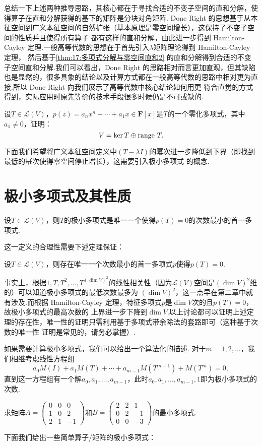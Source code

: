 总结一下上述两种推导思路，其核心都在于寻找合适的不变子空间的直和分解，使得算子在直和分解获得的基下的矩阵是分块对角矩阵.
 Done Right 的思想基于从本征空间到广义本征空间的自然扩张（基本原理是零空间增长），这保持了不变子空间的性质并且使得所有算子
都有这样的直和分解，由此进一步得到 Hamilton-Cayley 定理.一般高等代数的思想在于首先引入$\lambda$矩阵理论得到 Hamilton-Cayley 定理，
然后基于\autoref{thm:17:多项式分解与零空间直和2} 的直和分解得到合适的不变子空间直和分解.我们可以看出，Done Right 的思路相对而言更加直观，但其缺陷
也是显然的，很多具象的结论以及计算方式都在一般高等代数的思路中相对更为直接.所以 Done Right 向我们展示了高等代数中核心结论如何用更
符合直觉的方式得到，实际应用时原先等价的技术手段很多时候仍是不可或缺的.
\begin{example}
    设$T\in \mathcal{L}(V)$，$p(z)=a_nx^n+\cdots+a_1x\in\mathbf{F}[x]$是$T$的一个零化多项式，其中$a_1\neq 0$，证明：
    \[V=\ker T\oplus\textup{range }T.\]
\end{example}
下面我们希望将广义本征空间定义中$(T-\lambda I)$的幂次进一步降低到下界（即找到最低的幂次使得零空间停止增长），这需要引入极小多项式
的概念.

\section{极小多项式及其性质}
\begin{definition}
    设$T\in \mathcal{L}(V)$，则$T$的极小多项式是唯一一个使得$p(T)=0$的次数最小的首一多项式.
\end{definition}
这一定义的合理性需要下述定理保证：
\begin{theorem}
    设$T\in \mathcal{L}(V)$，则存在唯一一个次数最小的首一多项式$p$使得$p(T)=0$.
\end{theorem}
事实上，根据$1,T,T^2,\ldots,T^{(\dim V)^2}$的线性相关性（因为$\mathcal{L}(V)$空间是$(\dim V)^2$维的）可以知道极小多项式的最低次数最多为
$(\dim V)^2$，这一点早在第二章中就有涉及.而根据 Hamilton-Cayley 定理，特征多项式$p$是$\dim V$次的且$p(T)=0$，故极小多项式的最高次数的
上界进一步下降到$\dim V$.以上讨论都可以证明上述定理的存在性，唯一性的证明只需利用基于多项式带余除法的套路即可（这种基于次数的唯一性
证明是常见的，请务必掌握）.

如果需要计算极小多项式，我们可以给出一个算法化的描述. 对于$m=1,2,\ldots$，我们相继考虑线性方程组
\[a_0M(I)+a_1M(T)+\cdots+a_{m-1}M(T^{m-1})+M(T^m)=0,\]
直到这一方程组有一个解$a_0,a_1,\ldots,a_{m-1}$，此时$a_0,a_1,\ldots,a_{m-1},1$即为极小多项式的次数.
\begin{example} \label{ex:17:最小多项式}
    求矩阵$A=\begin{pmatrix}
        0 & 0 & 0 \\ 1 & 0 & 2 \\ 2 & 1 & -1
    \end{pmatrix}$和$B=\begin{pmatrix}
        2 & 2 & 1 \\ 0 & 2 & -1 \\ 0 & 0 & -3
    \end{pmatrix}$的最小多项式.
\end{example}
下面我们给出一些简单算子/矩阵的极小多项式：

